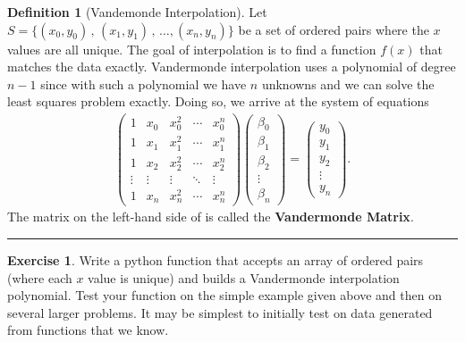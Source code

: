\documentclass[
]{book}
\theoremstyle{definition}
\newtheorem{definition}{Definition}[chapter]
\theoremstyle{definition}
\theoremstyle{definition}
\newtheorem{exercise}{Exercise}[chapter]
\theoremstyle{remark}
\begin{document}
\begin{definition}[Vandemonde Interpolation]
\protect\hypertarget{def:unnamed-chunk-840}{}{\label{def:unnamed-chunk-840} {} }Let \(S = \{(x_0,y_0) \,,\, (x_1,y_1) \,,\, \ldots, (x_n,y_n)\}\) be a set of ordered pairs where the \(x\) values are all unique. The goal of interpolation is to find a function \(f(x)\) that matches the data exactly. Vandermonde interpolation uses a polynomial of degree \(n-1\) since with such a polynomial we have \(n\) unknowns and we can solve the least squares problem exactly. Doing so, we arrive at the system of equations
\[\begin{aligned}
        \begin{pmatrix} 1 & x_0 & x_0^2 & \cdots & x_0^n \\
                        1 & x_1 & x_1^2 & \cdots & x_1^n \\
                        1 & x_2 & x_2^2 & \cdots & x_2^n \\
                        \vdots & \vdots & \vdots & \ddots & \vdots \\
                        1 & x_n & x_n^2 & \cdots & x_n^n \end{pmatrix}
        \begin{pmatrix} \beta_0 \\ \beta_1 \\ \beta_2 \\ \vdots \\ \beta_n \end{pmatrix}
        =
        \begin{pmatrix} y_0 \\ y_1 \\ y_2 \\ \vdots \\ y_n \end{pmatrix}.
    \end{aligned}\]
The matrix on the left-hand side of is called the \textbf{Vandermonde Matrix}.
\end{definition}

\begin{center}\rule{0.5\linewidth}{0.5pt}\end{center}

\begin{exercise}
\protect\hypertarget{exr:unnamed-chunk-841}{}{\label{exr:unnamed-chunk-841} }Write a python function that accepts an array of ordered pairs (where each \(x\) value is unique) and builds a Vandermonde interpolation polynomial. Test your function on the simple example given above and then on several larger problems. It may be simplest to initially test on data generated from functions that we know.
\end{exercise}
\end{document}
